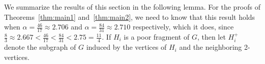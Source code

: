 \documentclass[12pt]{article}
\theoremstyle{plain}
\theoremstyle{definition}
\theoremstyle{remark}
\begin{document}

We summarize the results of this section in the following lemma. For the proofs
of Theorems~\ref{thm:main1} and~\ref{thm:main2}, we need to know that this result
holds when $\alpha=\frac{46}{17}\approx 2.706$ and $\alpha=\frac{84}{31}\approx
2.710$ respectively, which it does, since $\frac83\approx
2.667<\frac{46}{17}<\frac{84}{31}<2.75=\frac{11}4$.  If $H_i$ is a poor fragment
of $G$, then let $H_i^+$ denote the subgraph of $G$ induced by the vertices of
$H_i$ and the neighboring 2-vertices.
\end{document}
